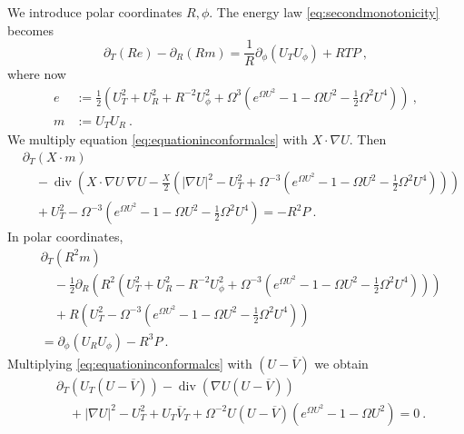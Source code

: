 \documentclass[a4paper]{amsart}
\providecommand{\abs}[1]{\lvert #1 \rvert}
\begin{document}
We introduce polar coordinates $R, \phi$. The energy law
\eqref{eq:secondmonotonicity} becomes
\begin{equation}
  \partial_T (R e)
  -
  \partial_R (R m)
  =
  \frac{1}{R} \partial_\phi (U_T U_\phi)
  +
  R T P \ ,
  \label{eq:energyfluxinpolar}
\end{equation}
where now
\begin{align*}
  e
  &:=
  \frac{1}{2}
  \left(
  U_T^2
  +
  U_R^2
  +
  R^{-2} U_\phi^2
  +
  \Omega^3
  \left(
  e^{\Omega U^2}
  -
  1
  -
  \Omega U^2
  -
  \frac{1}{2} \Omega^2 U^4
  \right)
  \right)
  \ ,
  \\
  m
  &:=
  U_T U_R
  \ .
\end{align*}
We multiply equation \eqref{eq:equationinconformalcs} with $X \cdot \nabla U$.
Then
\begin{equation*}
  \begin{split}
    &{\partial}_T (X \cdot m) \\
    &\quad
    -
    \operatorname{div}
    \left(
    X \cdot \nabla U\ \nabla U
    -
    \frac{X}{2}
    (\abs{\nabla U}^2 - U_T^2 + \Omega^{-3} (e^{\Omega U^2} - 1 - \Omega U^2 -
    \frac{1}{2} \Omega^2 U^4) )
    \right) \\
    &\quad
    +
    U_T^2 - \Omega^{-3} (e^{\Omega U^2} - 1 - \Omega U^2 - \frac{1}{2}
    \Omega^2 U^4)
    =
    -R^2 P
    \ .
  \end{split}
\end{equation*}
In polar coordinates,
\begin{equation}
  \begin{split}
    &\partial_T (R^2 m) \\
    &\quad-
    \frac{1}{2}
    \partial_R
    \left(
    R^2
    (
    U_T^2 + U_R^2 - R^{-2} U_\phi^2
    +
    \Omega^{-3}
    (e^{\Omega U^2} - 1 - \Omega U^2 - \frac{1}{2} \Omega^2 U^4)
    )
    \right) \\
    &\quad+
    R
    \left(
    U_T^2
    - 
    \Omega^{-3}
    (e^{\Omega U^2} - 1 - \Omega U^2 - \frac{1}{2} \Omega^2 U^4)
    \right) \\
    &=
    \partial_\phi (U_R U_\phi)
    -
    R^3 P \ .
  \end{split}
  \label{eq:conformalscalinginpolar}
\end{equation}
Multiplying \eqref{eq:equationinconformalcs} with $(U - \overline{V})$ we
obtain
\begin{equation*}
  \begin{split}
    &{\partial}_T
    (U_T (U - \overline{V}))
    -
    \operatorname{div}
    (\nabla U (U - \overline{V})) \\
    &\quad
    +\abs{\nabla U}^2 - U_T^2 + U_T \overline{V}_T 
    +\Omega^{-2} U (U - \overline{V}) (e^{\Omega U^2} - 1 - \Omega U^2)
    =
    0 \ .
  \end{split}
\end{equation*}
\end{document}
